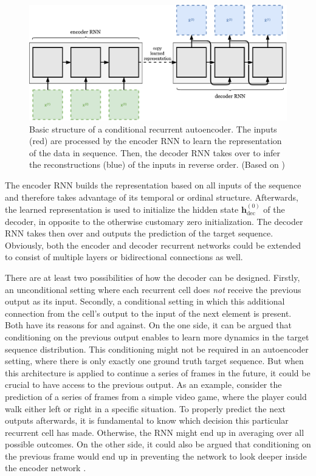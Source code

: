 \begin{figure}[htpb]
	\centering
	\includegraphics[width=.9\linewidth]{figures/rnn_autoencoder.pdf}
	\caption[Recurrent Autoencoder Model]{Basic structure of a conditional recurrent autoencoder. The inputs (red) are processed by the encoder RNN to learn the representation of the data in sequence. Then, the decoder RNN takes over to infer the reconstructions (blue) of the inputs in reverse order. (Based on \parencite{unsup_learn_lstm})} \label{fig:rnn-autoencoder}
\end{figure}

The encoder RNN builds the representation based on all inputs of the sequence and therefore takes advantage of its temporal or ordinal structure. Afterwards, the learned representation is used to initialize the hidden state $ \textbf{h}_{\textrm{dec}}^{(0)} $ of the decoder, in opposite to the otherwise customary zero initialization. The decoder RNN takes then over and outputs the prediction of the target sequence. Obviously, both the encoder and decoder recurrent networks could be extended to consist of multiple layers or bidirectional connections as well.

There are at least two possibilities of how the decoder can be designed. Firstly, an unconditional setting where each recurrent cell does \textit{not} receive the previous output as its input. Secondly, a conditional setting in which this additional connection from the cell's output to the input of the next element is present. Both have its reasons for and against. On the one side, it can be argued that conditioning on the previous output enables to learn more dynamics in the target sequence distribution. This conditioning might not be required in an autoencoder setting, where there is only exactly one ground truth target sequence. But when this architecture is applied to continue a series of frames in the future, it could be crucial to have access to the previous output. As an example, consider the prediction of a series of frames from a simple video game, where the player could walk either left or right in a specific situation. To properly predict the next outputs afterwards, it is fundamental to know which decision this particular recurrent cell has made. Otherwise, the RNN might end up in averaging over all possible outcomes. On the other side, it could also be argued that conditioning on the previous frame would end up in preventing the network to look deeper inside the encoder network \parencite{unsup_learn_lstm}.


